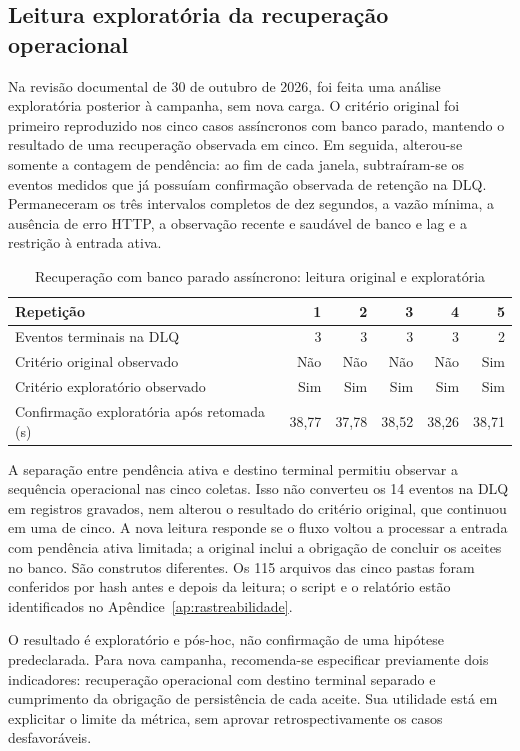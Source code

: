 \subsection{Leitura exploratória da recuperação operacional}
\label{sec:recuperacao-exploratoria}
Na revisão documental de 30 de outubro de 2026, foi feita uma análise exploratória posterior à campanha, sem nova carga. O critério original foi primeiro reproduzido nos cinco casos assíncronos com banco parado, mantendo o resultado de uma recuperação observada em cinco. Em seguida, alterou-se somente a contagem de pendência: ao fim de cada janela, subtraíram-se os eventos medidos que já possuíam confirmação observada de retenção na DLQ. Permaneceram os três intervalos completos de dez segundos, a vazão mínima, a ausência de erro HTTP, a observação recente e saudável de banco e lag e a restrição à entrada ativa.

\begin{table}[htbp]
\centering\small
\caption{Recuperação com banco parado assíncrono: leitura original e exploratória}\label{tab:recuperacao-exploratoria}
\begin{tabular}{lrrrrr}
\hline
Repetição & 1 & 2 & 3 & 4 & 5\\ \hline
Eventos terminais na DLQ & 3 & 3 & 3 & 3 & 2\\
Critério original observado & Não & Não & Não & Não & Sim\\
Critério exploratório observado & Sim & Sim & Sim & Sim & Sim\\
Confirmação exploratória após retomada (s) & 38,77 & 37,78 & 38,52 & 38,26 & 38,71\\ \hline
\end{tabular}
\end{table}

A separação entre pendência ativa e destino terminal permitiu observar a sequência operacional nas cinco coletas. Isso não converteu os 14 eventos na DLQ em registros gravados, nem alterou o resultado do critério original, que continuou em uma de cinco. A nova leitura responde se o fluxo voltou a processar a entrada com pendência ativa limitada; a original inclui a obrigação de concluir os aceites no banco. São construtos diferentes. Os 115 arquivos das cinco pastas foram conferidos por hash antes e depois da leitura; o script e o relatório estão identificados no Apêndice~\ref{ap:rastreabilidade}.

O resultado é exploratório e pós-hoc, não confirmação de uma hipótese predeclarada. Para nova campanha, recomenda-se especificar previamente dois indicadores: recuperação operacional com destino terminal separado e cumprimento da obrigação de persistência de cada aceite. Sua utilidade está em explicitar o limite da métrica, sem aprovar retrospectivamente os casos desfavoráveis.
